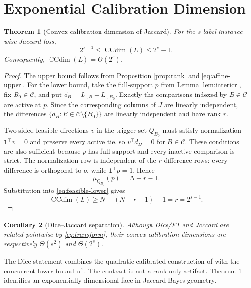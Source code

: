 \documentclass[twoside]{article}
\newtheorem{theorem}{Theorem}
\newtheorem{corollary}[theorem]{Corollary}
\newcommand{\CCdim}{\operatorname{CCdim}}
\newcommand{\1}{\mathbf 1}
\begin{document}
\section{Exponential Calibration Dimension}

\begin{theorem}[Convex calibration dimension of Jaccard]
\label{thm:ccdim}
For the $s$-label instance-wise Jaccard loss,
\begin{equation}
2^{s-1}\leq\CCdim(L)\leq2^s-1.
\label{eq:ccdim}
\end{equation}
Consequently, $\CCdim(L)=\Theta(2^s)$.
\end{theorem}

\begin{proof}
The upper bound follows from Proposition \ref{prop:rank} and \eqref{eq:affine-upper}. For the lower bound, take the full-support $p$ from Lemma \ref{lem:interior}, fix $B_0\in\mathcal C$, and put $d_B=L_{\cdot,B}-L_{\cdot,B_0}$. Exactly the comparisons indexed by $B\in\mathcal C$ are active at $p$. Since the corresponding columns of $J$ are linearly independent, the differences $\{d_B:B\in\mathcal C\setminus\{B_0\}\}$ are linearly independent and have rank $r$.

Two-sided feasible directions $v$ in the trigger set $Q_{B_0}$ must satisfy normalization $\1^\top v=0$ and preserve every active tie, so $v^\top d_B=0$ for $B\in\mathcal C$. These conditions are also sufficient because $p$ has full support and every inactive comparison is strict. The normalization row is independent of the $r$ difference rows: every difference is orthogonal to $p$, while $\1^\top p=1$. Hence
\begin{equation}
\mu_{Q_{B_0}}(p)=N-r-1.
\end{equation}
Substitution into \eqref{eq:feasible-lower} gives
\begin{equation}
\CCdim(L)\geq N-(N-r-1)-1=r=2^{s-1}.
\end{equation}
\end{proof}

\begin{corollary}[Dice--Jaccard separation]
\label{cor:separation}
Although Dice/F1 and Jaccard are related pointwise by \eqref{eq:transform}, their convex calibration dimensions are respectively $\Theta(s^2)$ and $\Theta(2^s)$.
\end{corollary}

The Dice statement combines the quadratic calibrated construction of \citet{zhang2020convex} with the concurrent lower bound of \citet{zhang2026exact}. The contrast is not a rank-only artifact. Theorem \ref{thm:ccdim} identifies an exponentially dimensional face in Jaccard Bayes geometry.
\end{document}
